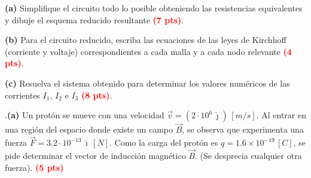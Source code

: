\documentclass[addpoints,12pt]{exam}
\newcommand{\qpts}[1]{{\setlength{\fboxsep}{2.5pt}\fbox{#1}}\hspace{0.6em}\ignorespaces}
\newcommand{\qhead}[1]{\thequestion.\hspace{0.5em}\qpts{#1}}
\newcommand{\pts}[1]{\textcolor{red}{\textbf{(#1 pts)}}}
\begin{document}
\begin{questions}
\medskip
\noindent\textbf{(a)} Simplifique el circuito todo lo posible obteniendo las resistencias
equivalentes y dibuje el esquema reducido resultante \pts{7}.

\vspace{4.5cm}
\noindent\textbf{(b)} Para el circuito reducido, escriba las ecuaciones de las leyes de Kirchhoff
(corriente y voltaje) correspondientes a cada malla y a cada nodo relevante \pts{4}.

\vspace{4.5cm}
\noindent\textbf{(c)} Resuelva el sistema obtenido para determinar los valores num\'ericos de las
corrientes $I_1$, $I_2$ e $I_3$ \pts{8}.

\newpage

\question[20]
\qhead{20}\textbf{(a)} Un prot\'on se mueve con una velocidad $\vec{v} = (2\cdot10^{6}\,\hat{\jmath})\,[m/s]$.
Al entrar en una regi\'on del espacio donde existe un campo $\vec{B}$, se observa que experimenta una
fuerza $\vec{F} = 3.2\cdot10^{-13}\,\hat{\imath}\,[N]$. Como la carga del prot\'on es
$q = 1.6\times10^{-19}\,[C]$, se pide determinar el vector de inducci\'on magn\'etico $\vec{B}$.
(Se desprecia cualquier otra fuerza). \pts{5}

\vspace{5.5cm}


\end{questions}
\end{document}
